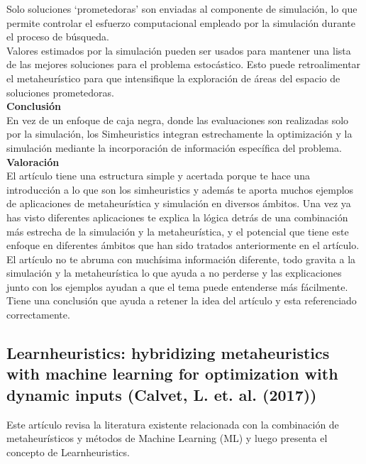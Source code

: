 \documentclass[11pt]{article} %
\begin{document}
Solo soluciones ‘prometedoras’ son enviadas al componente de simulación, lo que permite controlar el esfuerzo computacional empleado por la simulación durante el proceso de búsqueda.\\[0.1cm]

Valores estimados por la simulación pueden ser usados para mantener una lista de las mejores soluciones para el problema estocástico. Esto puede retroalimentar el metaheurístico para que intensifique la exploración de áreas del espacio de soluciones prometedoras.\\

\textbf{Conclusión}\\[0.2cm]
En vez de un enfoque de caja negra, donde las evaluaciones son realizadas solo por la simulación, los Simheuristics integran estrechamente la optimización y la simulación mediante la incorporación de información específica del problema.\\[0.2cm]


\textbf{Valoración}\\[0.2cm]

El artículo tiene una estructura simple y acertada porque te hace una introducción a lo que son los simheuristics y además te aporta muchos ejemplos de aplicaciones de metaheurística y simulación en diversos ámbitos. Una vez ya has visto diferentes aplicaciones te explica la lógica detrás de una combinación más estrecha de la simulación y la metaheurística, y el potencial que tiene este enfoque en diferentes ámbitos que han sido tratados anteriormente en el artículo.\\[0.2cm]
El artículo no te abruma con muchísima información diferente, todo gravita a la simulación y la metaheurística lo que ayuda a no perderse y las explicaciones junto con los ejemplos ayudan a que el tema puede entenderse más fácilmente.\\[0.2cm]
Tiene una conclusión que ayuda a retener la idea del artículo y esta referenciado correctamente.


\subsection{Learnheuristics: hybridizing metaheuristics with machine learning for optimization with dynamic inputs (Calvet, L. et. al. (2017))}

Este artículo revisa la literatura existente relacionada con la combinación de metaheurísticos y métodos de Machine Learning (ML) y luego presenta el concepto de Learnheuristics.\\[0.2cm]
\end{document}
